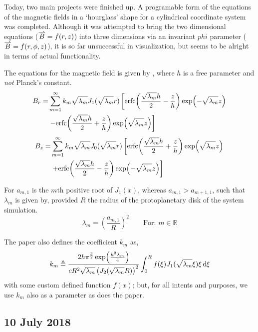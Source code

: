 \documentclass[twocolumn]{article}
\begin{document}
Today, two main projects were finished up. A programable form of the equations of the magnetic fields in a `hourglass' shape for a cylindrical coordinate system was completed. Although it was attempted to bring the two dimensional equations ($\vect{B} = f(r,z)$) into three dimensions via an invariant $phi$ parameter ($\vect{B} = f(r,\phi,z)$), it is so far unsuccessful in visualization, but seems to be alright in terms of actual functionality.

The equations for the magnetic field is given by \cite{Ewertowski_Basu_2013}, where $h$ is a free parameter and \textit{not} Planck's constant.
\begin{align}
	B_r =& \sum_{m=1}^{\infty} k_m \sqrt{\lambda_m} J_1(\sqrt{\lambda_m} r) \left\lbrack \erfc{\frac{\sqrt{\lambda_m} h}{2} - \frac{z}{h}} \exp{-\sqrt{\lambda_m} z} \right. \nonumber \\ 
	&\left. - \erfc{\frac{\sqrt{\lambda_m} h}{2} + \frac{z}{h}} \exp{\sqrt{\lambda_m} z} \right\rbrack
	\label{eq:Ewertowski_Basu_B_r_equation}
\end{align}
\begin{align}
	B_z =& \sum_{m=1}^{\infty} k_m \sqrt{\lambda_m} J_0(\sqrt{\lambda_m} r) \left\lbrack \erfc{\frac{\sqrt{\lambda_m} h}{2} + \frac{z}{h}} \exp{\sqrt{\lambda_m} z} \right.  \nonumber \\ 
	&\left. + \erfc{\frac{\sqrt{\lambda_m} h}{2} - \frac{z}{h}} \exp{-\sqrt{\lambda_m} z} \right\rbrack
	\label{eq:Ewertowski_Basu_B_r_equation}
\end{align}

For $a_{m,1}$ is the $m$th positive root of $J_1(x)$, whereas $a_{m,1} > a_{m+1,1}$, such that $\lambda_m$ is given by, provided $R$ the radius of the protoplanetary disk of the system simulation.
\begin{equation*}
	\lambda_m = \left( \frac{a_{m,1}}{R} \right)^2 \qquad \text{For: } m \in \mathbb{R}
\end{equation*}

The paper also defines the coefficient $k_m$ as,
\begin{equation*}
	k_m \triangleq \frac{2 h \pi^{\frac{3}{2}} \exp{\frac{h^2 \lambda_m}{4}}}{c R^2 \sqrt{\lambda_m} \left( J_2(\sqrt{\lambda_m} R) \right)^2} \int_0^R f(\xi) J_1(\sqrt{\lambda_m} \xi) \xi \diff{\xi}
\end{equation*}
with some custom defined function $f(x)$; but, for all intents and purposes, we use $k_m$ also as a parameter as does the paper.

\subsection{10 July 2018}
\label{subsec:10_July_2018}
\end{document}
